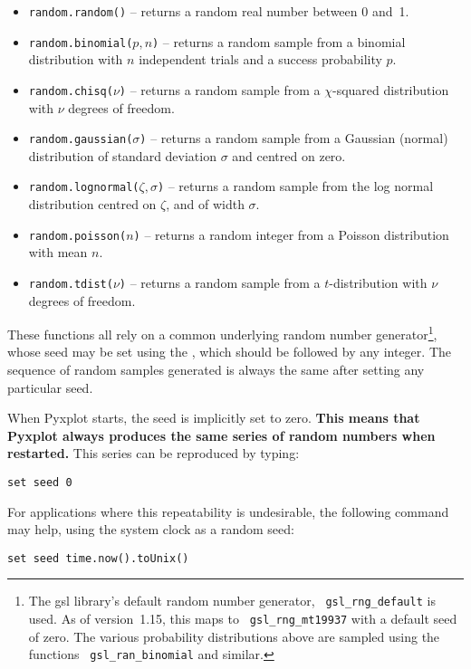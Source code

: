 \begin{itemize}
\item {\tt random.random()} -- returns a random real number between 0 and~1.
\item {\tt random.binomial($p,n$)} -- returns a random sample from a binomial distribution with $n$ independent trials and a success probability $p$.
\item {\tt random.chisq($\nu$)} -- returns a random sample from a $\chi$-squared distribution with $\nu$ degrees of freedom.
\item {\tt random.gaussian($\sigma$)} -- returns a random sample from a Gaussian (normal) distribution of standard deviation $\sigma$ and centred on zero.
\item {\tt random.lognormal($\zeta,\sigma$)} -- returns a random sample from the log normal distribution centred on $\zeta$, and of width $\sigma$.
\item {\tt random.poisson($n$)} -- returns a random integer from a Poisson distribution with mean $n$.
\item {\tt random.tdist($\nu$)} -- returns a random sample from a $t$-distribution with $\nu$ degrees of freedom.
\end{itemize}

\noindent These functions all rely on a common underlying random number
generator\footnote{The gsl library's default random number generator, {\tt
gsl\_\-rng\_\-default} is used. As of version~1.15, this maps to {\tt
gsl\_\-rng\_\-mt19937} with a default seed of zero. The various probability
distributions above are sampled using the functions {\tt
gsl\_\-ran\_\-binomial} and similar.}, whose seed may be set using the
, which should be followed by any integer. The sequence of
random samples generated is always the same after setting any particular seed.

When Pyxplot starts, the seed is implicitly set to zero. {\bf This means that
Pyxplot always produces the same series of random numbers when restarted.} This
series can be reproduced by typing:
\begin{verbatim}
set seed 0
\end{verbatim}

\noindent For applications where this repeatability is undesirable, the
following command may help, using the system clock as a random seed:
\begin{verbatim}
set seed time.now().toUnix()
\end{verbatim}


